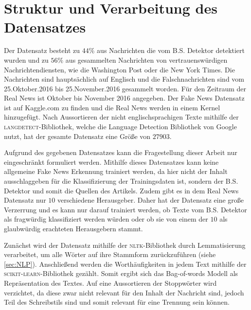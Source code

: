 \chapter{Struktur und Verarbeitung des Datensatzes}
\label{sec:struct}

Der Datensatz besteht zu $44\%$ aus Nachrichten die vom B.S. Detektor detektiert wurden und zu $56\%$ aus gesammelten 
Nachrichten von vertrauenswürdigen Nachrichtendiensten, wie die Washington Post oder die New York Times. Die Nachrichten 
sind hauptsächlich auf Englisch und die Falschnachrichten sind vom 25.Oktober.2016 bis 25.November.2016 gesammelt worden. Für den Zeitraum 
der Real News ist Oktober bis November 2016 angegeben. 
Der Fake News Datensatz ist auf Kaggle.com zu finden\cite{fake_data} und die Real News werden in einem Kernel hinzugefügt\cite{real_data}.
Nach Aussortieren der nicht englischsprachigen Texte mithilfe der \textsc{langdetect}-Bibliothek\cite{langdetect}, welche die
Language Detection Bibliothek von Google\cite{google_langdetect} nutzt, hat der gesamte Datensatz eine Größe von 
$\num{27903}$.

Aufgrund des gegebenen Datensatzes kann die Fragestellung dieser Arbeit nur eingeschränkt formuliert werden.
Mithilfe dieses Datensatzes kann keine allgemeine Fake News Erkennung trainiert werden, da hier nicht der Inhalt 
ausschlaggeben für die Klassifizierung der Trainingsdaten ist, sondern der B.S. Detektor und somit die Quellen des 
Artikels. 
Zudem gibt es in dem Real News Datensatz nur $10$ verschiedene Herausgeber.
Daher hat der Datensatz eine große Verzerrung und es kann nur darauf trainiert werden, ob Texte vom B.S. Detektor 
als fragwürdig klassifiziert werden würden oder ob sie von einem der $10$ als glaubwürdig erachteten Herausgebern stammt.

Zunächst wird der Datensatz mithilfe der \textsc{nltk}-Bibliothek\cite{nltk} durch Lemmatisierung verarbeitet, um 
alle Wörter auf ihre Stammform zurückzuführen (siehe \ref{sec:NLP}). 
Anschließend werden die Worthäufigkeiten in jedem Text mithilfe der \textsc{scikit-learn}-Bibliothek\cite{scikit-learn} 
gezählt. 
Somit ergibt sich das Bag-of-words Modell als Repräsentation des Textes.
Auf eine Aussortieren der Stoppwörter wird verzichtet, da diese zwar nicht relevant für den Inhalt der Nachricht sind,
jedoch Teil des Schreibstils sind und somit relevant für eine Trennung sein können.

